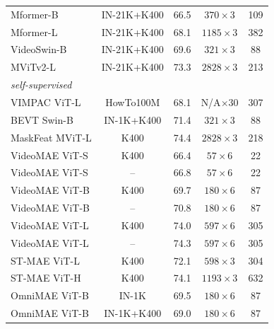 \begin{enrichment}
\begin{enrichment}
\begin{table}[H]
{\begin{tabular}{lcccc}
                        Mformer-B \cite{patrick2021_mformer} & IN-21K+K400 & 66.5 & $370{\times}3$ & 109 \\
                        Mformer-L \cite{patrick2021_mformer} & IN-21K+K400 & 68.1 & $1185{\times}3$ & 382 \\
                        VideoSwin-B \cite{liu2022_videoswin} & IN-21K+K400 & 69.6 & $321{\times}3$ & 88 \\
                        MViTv2-L \cite{li2021_improved_mvit} & IN-21K+K400 & 73.3 & $2828{\times}3$ & 213 \\
                        \midrule
                        \multicolumn{5}{l}{\emph{self-supervised}} \\
                        VIMPAC ViT-L \cite{tan2021_vimpac} & HowTo100M & 68.1 & N/A$\times$30 & 307 \\
                        BEVT Swin-B \cite{wang2022_bevt} & IN-1K+K400 & 71.4 & $321{\times}3$ & 88 \\
                        MaskFeat MViT-L \cite{wei2022_maskfeat} & K400 & 74.4 & $2828{\times}3$ & 218 \\
                        VideoMAE ViT-S \cite{tong2022_videomae} & K400 & 66.4 & $57{\times}6$ & 22 \\
                        VideoMAE ViT-S \cite{tong2022_videomae} & -- & 66.8 & $57{\times}6$ & 22 \\
                        VideoMAE ViT-B \cite{tong2022_videomae} & K400 & 69.7 & $180{\times}6$ & 87 \\
                        VideoMAE ViT-B \cite{tong2022_videomae} & -- & 70.8 & $180{\times}6$ & 87 \\
                        VideoMAE ViT-L \cite{tong2022_videomae} & K400 & 74.0 & $597{\times}6$ & 305 \\
                        VideoMAE ViT-L \cite{tong2022_videomae} & -- & 74.3 & $597{\times}6$ & 305 \\
                        ST-MAE ViT-L \cite{feichtenhofer2022_mae_st} & K400 & 72.1 & $598{\times}3$ & 304 \\
                        ST-MAE ViT-H \cite{feichtenhofer2022_mae_st} & K400 & 74.1 & $1193{\times}3$ & 632 \\
                        OmniMAE ViT-B \cite{girdhar2023_omnimae} & IN-1K & 69.5 & $180{\times}6$ & 87 \\
                        OmniMAE ViT-B \cite{girdhar2023_omnimae} & IN-1K+K400 & 69.0 & $180{\times}6$ & 87 \\

\end{tabular}}
\end{table}
\end{enrichment}
\end{enrichment}
